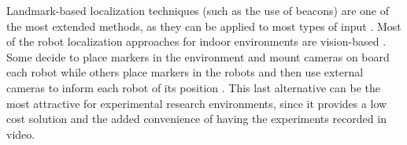 Landmark-based localization techniques (such as the use of beacons) are one of the most extended methods, as they can be applied to most types of input \cite{EscaleraMoreno96, Fox00Pro}. Most of the robot localization approaches for indoor environments are vision-based \cite{chen2009towards}. Some decide to place markers in the environment and mount cameras on board each robot \cite{gifford2009low, HongboHongnian07} while others place markers in the robots and then use external cameras to inform each robot of its position \cite{reina2012zeppelin, jatmiko2011robots}. This last alternative can be the most attractive for experimental research environments, since it provides a low cost solution and the added convenience of having the experiments recorded in video.






















